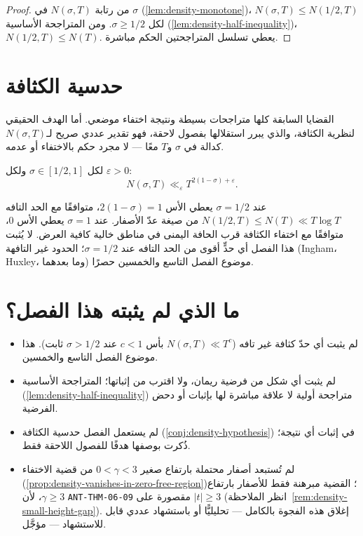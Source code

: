 \begin{proof}
من رتابة \(N(\sigma,T)\) في \(\sigma\)
(\ref{lem:density-monotone})، \(N(\sigma,T)\le N(1/2,T)\) لكل
\(\sigma\ge1/2\). ومن المتراجحة الأساسية (\ref{lem:density-half-inequality})،
\(N(1/2,T)\le N(T)\). يعطي تسلسل المتراجحتين الحكم مباشرة.
\end{proof}

\section{حدسية الكثافة}

القضايا السابقة كلها متراجحات بسيطة ونتيجة اختفاء موضعي. أما الهدف
الحقيقي لنظرية الكثافة، والذي يبرر استقلالها بفصول لاحقة، فهو تقدير
عددي صريح لـ\(N(\sigma,T)\) كدالة في \(\sigma\) و\(T\) معًا — لا مجرد
حكم بالاختفاء أو عدمه.

\begin{conjecture}
\label{conj:density-hypothesis}
لكل \(\sigma\in[1/2,1]\) ولكل \(\varepsilon>0\):
\[
N(\sigma,T)\ll_\varepsilon T^{2(1-\sigma)+\varepsilon}.
\]
\end{conjecture}

\begin{remark}
عند \(\sigma=1/2\) يعطي الأس \(2(1-\sigma)=1\)، متوافقًا مع الحد التافه
\(N(1/2,T)\le N(T)\ll T\log T\) من صيغة عدّ الأصفار. عند \(\sigma=1\)
يعطي الأس \(0\)، متوافقًا مع اختفاء الكثافة قرب الحافة اليمنى في مناطق
خالية كافية العرض. لا يُثبت هذا الفصل أي حدٍّ أقوى من الحد التافه عند
\(\sigma=1/2\)؛ الحدود غير التافهة (Ingham، Huxley، وما بعدهما) موضوع
الفصل التاسع والخمسين حصرًا.
\end{remark}

\section{ما الذي لم يثبته هذا الفصل؟}

\begin{itemize}
  \item لم يثبت أي حدّ كثافة غير تافه (\(N(\sigma,T)\ll T^{c}\) بأس
  \(c<1\) عند \(\sigma>1/2\) ثابت). هذا موضوع الفصل التاسع والخمسين.
  \item لم يثبت أي شكل من فرضية ريمان، ولا اقترب من إثباتها؛ المتراجحة
  الأساسية (\ref{lem:density-half-inequality}) متراجحة أولية لا علاقة
  مباشرة لها بإثبات أو دحض الفرضية.
  \item لم يستعمل الفصل حدسية الكثافة (\ref{conj:density-hypothesis})
  في إثبات أي نتيجة؛ ذُكرت بوصفها هدفًا للفصول اللاحقة فقط.
  \item لم تُستبعد أصفار محتملة بارتفاع صغير \(0<\gamma<3\) من قضية
  الاختفاء (\ref{prop:density-vanishes-in-zero-free-region})؛ القضية
  مبرهنة فقط للأصفار بارتفاع \(\gamma\ge3\)، لأن
  \textenglish{\texttt{ANT-THM-06-09}} مقصورة على \(|t|\ge3\) (انظر
  الملاحظة~\ref{rem:density-small-height-gap}). إغلاق هذه الفجوة
  بالكامل — تحليليًّا أو باستشهاد عددي قابل للاستشهاد — مؤجَّل.
\end{itemize}

